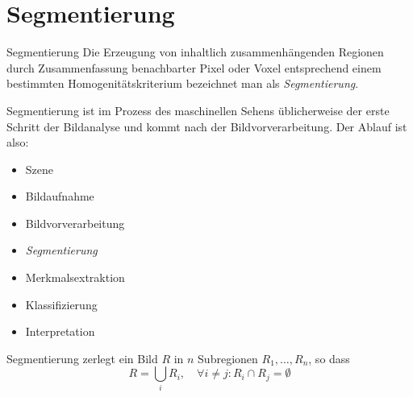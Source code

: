 \section{Segmentierung}

\begin{defi}{Segmentierung}
    Die Erzeugung von inhaltlich zusammenhängenden Regionen durch Zusammenfassung benachbarter Pixel oder Voxel entsprechend einem bestimmten Homogenitätskriterium bezeichnet man als \emph{Segmentierung}.

    Segmentierung ist im Prozess des maschinellen Sehens üblicherweise der erste Schritt der Bildanalyse und kommt nach der Bildvorverarbeitung.
    Der Ablauf ist also:
    \begin{itemize}
        \item Szene
        \item Bildaufnahme
        \item Bildvorverarbeitung
        \item \emph{Segmentierung}
        \item Merkmalsextraktion
        \item Klassifizierung
        \item Interpretation
    \end{itemize}

    Segmentierung zerlegt ein Bild $R$ in $n$ Subregionen $R_1, \ldots, R_n$, so dass
    \[
        R = \bigcup_i R_i, \quad \forall i \neq j: R_i \cap R_j = \emptyset
    \]


\end{defi}
